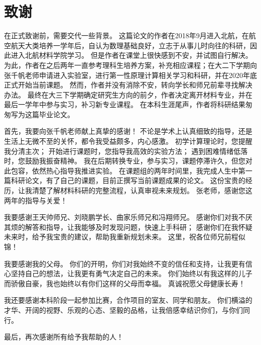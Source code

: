 \chapter*{致谢}

在正式致谢前，需要交代一些背景。
这篇论文的作者在2018年9月进入北航，在航空航天大类培养一学年后，自认为数理基础良好，立志于从事儿时向往的科研，因此进入北航材料学院学习。
但是作者在课堂上很快感到不安，并试图自行解决。
为此，作者在之后两年一直参考理科生培养方案，补充相应课程；在大二下学期向张千帆老师申请进入实验室，进行第一性原理计算相关学习和科研，并在2020年底正式开始当前课题。
然而，作者并没有消除不安，转向学长和师兄前辈寻找解决办法。
最终在大三下学期确定研究生方向的前夕，作者决定离开材料专业，并在最后一学年中参与实习，补习新专业课程。
在本科生涯尾声，作者将科研结果匆匆写为这篇毕业论文。

首先，我要向张千帆老师献上真挚的感谢！
不论是学术上认真细致的指导，还是生活上无微不至的关怀，都令我受益颇多，内心感激。
初学计算理论时，您提醒我分清主次；
开始进行课题时，您指导我高效的实验方法；
遇到困难情绪低落时，您鼓励我振奋精神。
我在后期转换专业，参与实习，课题停滞许久，但您对此包容，依然热心指导我推进实验。
在课题组的两年时间里，我完成人生中第一篇科研论文，有了自己的课题，目前正撰写当前课题成果的论文。
这份宝贵的经历，让我清楚了解材料科研的完整流程，认真审视未来规划。
张老师，感谢您这两年的指导与关爱！

我要感谢王天帅师兄、刘晓鹏学长、曲家乐师兄和冯翔师兄。
感谢你们对我不厌其烦的解答和指导，让我能够及时发现问题，快速上手科研；
感谢你们在我怀疑未来时，给予我宝贵的建议，帮助我重新规划未来。
这里，祝各位师兄前程似锦！

我要感谢我的父母。
你们的开明，你们对我始终不变的信任和支持，让我更有信心坚持自己的想法，让我更有勇气决定自己的未来。
你们始终以有我这样的儿子而骄傲自豪，我也始终以有你们这样的父母而幸福。
真诚祝愿父母健康长寿！

我还要感谢本科阶段一起参加比赛，合作项目的室友、同学和朋友。
你们横溢的才华、开阔的视野、乐观的心态、坚毅的品格，让我倍感幸结识你们，与你们同行。

最后，再次感谢所有给予我帮助的人！

\cleardoublepage
